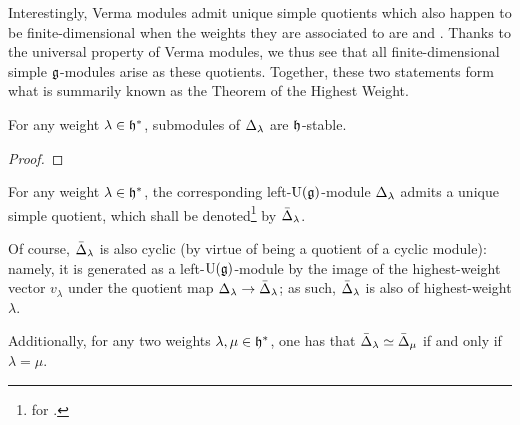         Interestingly, Verma modules admit unique simple quotients which also happen to be finite-dimensional when the weights they are associated to are  and . Thanks to the universal property of Verma modules, we thus see that all finite-dimensional simple $\mathfrak{g}$-modules arise as these quotients. Together, these two statements form what is summarily known as the Theorem of the Highest Weight. 
        \begin{lemma} \label{lemma: cartan_semi_simplicity_of_submodules_of_verma_modules}
            For any weight $\lambda \in \mathfrak{h}^*$, submodules of $\Delta_{\lambda}$ are $\mathfrak{h}$-stable.
        \end{lemma}
            \begin{proof}
                
            \end{proof}
        \begin{proposition} \label{prop: unique_simple_quotients_of_verma_modules}
            For any weight $\lambda \in \mathfrak{h}^*$, the corresponding left-$\mathrm{U}(\mathfrak{g})$-module $\Delta_{\lambda}$ admits a unique simple quotient, which shall be denoted\footnote{ for .} by $\bar{\Delta}_{\lambda}$.
            
            Of course, $\bar{\Delta}_{\lambda}$ is also cyclic (by virtue of being a quotient of a cyclic module): namely, it is generated as a left-$\mathrm{U}(\mathfrak{g})$-module by the image of the highest-weight vector $v_{\lambda}$ under the quotient map $\Delta_{\lambda} \to \bar{\Delta}_{\lambda}$; as such, $\bar{\Delta}_{\lambda}$ is also of highest-weight $\lambda$. 

            Additionally, for any two weights $\lambda, \mu \in \mathfrak{h}^*$, one has that $\bar{\Delta}_{\lambda} \simeq \bar{\Delta}_{\mu}$ if and only if $\lambda = \mu$. 
        \end{proposition}
